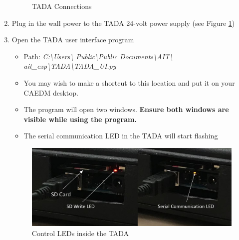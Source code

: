 \documentclass[letterpaper,11pt]{article}
\begin{document}
\begin{enumerate}
        
\begin{figure}[H]
    \centering
    \caption{TADA Connections}
    \label{fig:tada_connect}
\end{figure}
        
    \item Plug in the wall power to the TADA 24-volt power supply (see Figure 
        \ref{fig:tada_connect})

    \item Open the TADA user interface program
            \begin{itemize}
            \item Path: \textit{C:\textbackslash Users\textbackslash  
                Public\textbackslash Public Documents\textbackslash AIT\textbackslash 
                ait\_exp\textbackslash TADA\textbackslash TADA\_UI.py}
            \item You may wish to make a shortcut to this location and put it on 
                your CAEDM desktop.
            \item The program will open two windows. \textbf{Ensure both 
                windows are visible while using the program.}
            \item The serial communication LED in the TADA will start flashing
            \end{itemize}

\begin{figure}[H]
    \centering
    \includegraphics[width=.75\textwidth]{led_red_yellow.jpg}
    \caption{Control LEDs inside the TADA}
    \label{fig:tada_leds}
\end{figure}


\end{enumerate}
\end{document}
